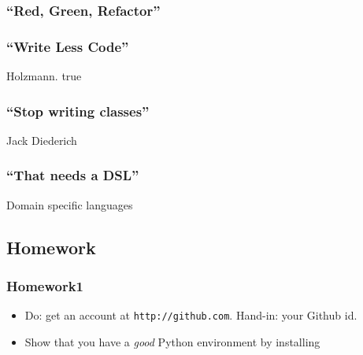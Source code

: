 \subsubsection{\texorpdfstring{``Red, Green,
Refactor''}{Red, Green, Refactor}}\label{red-green-refactor}

\subsubsection{\texorpdfstring{``Write Less
Code''}{Write Less Code}}\label{write-less-code}

Holzmann. true

\subsubsection{\texorpdfstring{``Stop writing
classes''}{Stop writing classes}}\label{stop-writing-classes}

Jack Diederich

\subsubsection{\texorpdfstring{``That needs a
DSL''}{That needs a DSL}}\label{that-needs-a-dsl}

Domain specific languages

\subsection{Homework}\label{homework}

\subsubsection{Homework1}\label{homework1}

\begin{itemize}
\itemsep1pt\parskip0pt
\item
  Do: get an account at \texttt{http://github.com}. Hand-in: your Github
  id.
\item
  Show that you have a \emph{good} Python environment by installing
\end{itemize}
